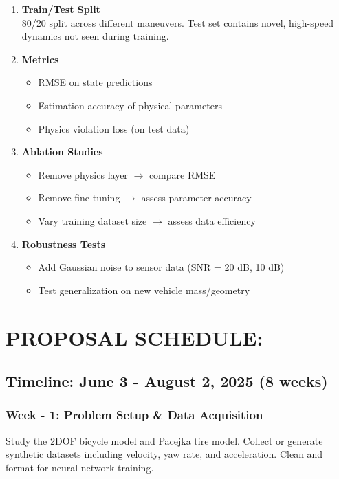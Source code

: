 \documentclass{article}
\begin{document}
\begin{enumerate}
    \item \textbf{Train/Test Split} \\
    80/20 split across different maneuvers. Test set contains novel, high-speed dynamics not seen during training.

    \item \textbf{Metrics} \\
    \begin{itemize}
        \item RMSE on state predictions
        \item Estimation accuracy of physical parameters
        \item Physics violation loss (on test data)
    \end{itemize}

    \item \textbf{Ablation Studies} \\
    \begin{itemize}
        \item Remove physics layer $\rightarrow$ compare RMSE
        \item Remove fine-tuning $\rightarrow$ assess parameter accuracy
        \item Vary training dataset size $\rightarrow$ assess data efficiency
    \end{itemize}

    \item \textbf{Robustness Tests} \\
    \begin{itemize}
        \item Add Gaussian noise to sensor data (SNR = 20 dB, 10 dB)
        \item Test generalization on new vehicle mass/geometry
    \end{itemize}
\end{enumerate}


\section*{PROPOSAL SCHEDULE:}

\subsection*{Timeline: June 3 - August 2, 2025 (8 weeks)}

\subsubsection*{Week - 1: Problem Setup \& Data Acquisition}
Study the 2DOF bicycle model and Pacejka tire model. Collect or generate synthetic datasets including velocity, yaw rate, and acceleration. Clean and format for neural network training.
\end{document}
